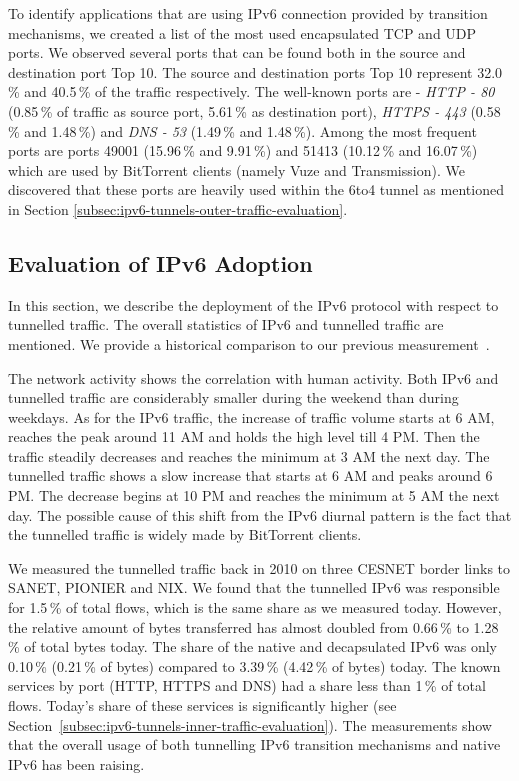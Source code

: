 To identify applications that are using IPv6 connection provided by transition mechanisms, we created a list of the most used encapsulated TCP and UDP ports. We observed several ports that can be found both in the source and destination port Top 10. The source and destination ports Top 10 represent 32.0\,\% and 40.5\,\% of the traffic respectively. The well-known ports are - \emph{HTTP - 80} (0.85\,\% of traffic as source port, 5.61\,\% as destination port), \emph{HTTPS - 443} (0.58\,\% and 1.48\,\%) and \emph{DNS - 53} (1.49\,\% and 1.48\,\%). Among the most frequent ports are ports 49001 (15.96\,\% and 9.91\,\%) and 51413 (10.12\,\% and 16.07\,\%) which are used by BitTorrent clients (namely Vuze
and Transmission). We discovered that these ports are heavily used within the 6to4 tunnel as mentioned in Section \ref{subsec:ipv6-tunnels-outer-traffic-evaluation}.

\subsection{Evaluation of IPv6 Adoption} \label{subsec:ipv6-tunnels-evaluation-of-ipv6}

In this section, we describe the deployment of the IPv6 protocol with respect to tunnelled traffic. The overall statistics of IPv6 and tunnelled traffic are mentioned. We provide a historical comparison to our previous measurement~\cite{Elich-2011-Monitoring}. 

The network activity shows the correlation with human activity. Both IPv6 and tunnelled traffic are considerably smaller during the weekend than during weekdays. As for the IPv6 traffic, the increase of traffic volume starts at 6 AM, reaches the peak around 11 AM and holds the high level till 4 PM. Then the traffic steadily decreases and reaches the minimum at 3 AM the next day. The tunnelled traffic shows a slow increase that starts at 6 AM and peaks around 6 PM. The decrease begins at 10 PM and reaches the minimum at 5 AM the next day. The possible cause of this shift from the IPv6 diurnal pattern is the fact that the tunnelled traffic is widely made by BitTorrent clients.

We measured the tunnelled traffic back in 2010 on three CESNET border links to SANET, PIONIER and NIX. We found that the tunnelled IPv6 was responsible for 1.5\,\% of total flows, which is the same share as we measured today. However, the relative amount of bytes transferred has almost doubled from 0.66\,\% to 1.28\,\% of total bytes today. The share of the native and decapsulated IPv6 was only 0.10\,\% (0.21\,\% of bytes) compared to 3.39\,\% (4.42\,\% of bytes) today. The known services by port (HTTP, HTTPS and DNS) had a share less than 1\,\% of total flows. Today's share of these services is significantly higher (see Section~\ref{subsec:ipv6-tunnels-inner-traffic-evaluation}). The measurements show that the overall usage of both tunnelling IPv6 transition mechanisms and native IPv6 has been raising.

